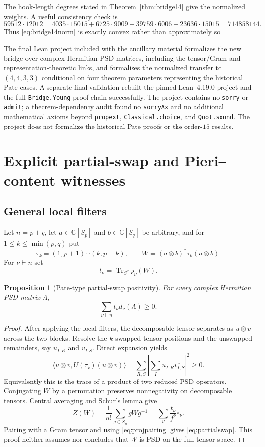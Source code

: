 \documentclass[11pt]{article}
\newtheorem{proposition}[theorem]{Proposition}
\theoremstyle{definition}
\newcommand{\Tr}{\operatorname{Tr}}
\newcommand{\C}{\mathbb C}
\begin{document}
The hook-length degrees stated in Theorem~\ref{thm:bridge14} give the normalized weights.  A useful consistency check is
\[
 59512\cdot12012=4035\cdot15015+6725\cdot9009+39759\cdot6006+23636\cdot15015=714858144.
\]
Thus \eqref{eq:bridge14norm} is exactly convex rather than approximately so.

The final Lean project included with the ancillary material formalizes the new bridge over complex Hermitian PSD matrices, including the tensor/Gram and representation-theoretic links, and formalizes the normalized transfer to $(4,4,3,3)$ conditional on four theorem parameters representing the historical Pate cases.  A separate final validation rebuilt the pinned Lean~4.19.0 project and the full \texttt{Bridge.Young} proof chain successfully.  The project contains no \texttt{sorry} or \texttt{admit}; a theorem-dependency audit found no \texttt{sorryAx} and no additional mathematical axioms beyond \texttt{propext}, \texttt{Classical.choice}, and \texttt{Quot.sound}.  The project does not formalize the historical Pate proofs or the order-$15$ results.

\section{Explicit partial-swap and Pieri--content witnesses}\label{sec:pieri}
\subsection{General local filters}
Let $n=p+q$, let $a\in\C[S_p]$ and $b\in\C[S_q]$ be arbitrary, and for $1\le k\le\min(p,q)$ put
\[
 \tau_k=(1,p+1)\cdots(k,p+k),\qquad
 W=(a\otimes b)^*\tau_k(a\otimes b).
\]
For $\nu\vdash n$ set
\[
 t_\nu=\Tr_{S^\nu}\rho_\nu(W).
\]

\begin{proposition}[Pate-type partial-swap positivity]\label{prop:partialswap}
For every complex Hermitian PSD matrix $A$,
\begin{equation}\label{eq:partialswap}
 \sum_{\nu\vdash n}t_\nu d_\nu(A)\ge0.
\end{equation}
\end{proposition}

\begin{proof}
After applying the local filters, the decomposable tensor separates as $u\otimes v$ across the two blocks.  Resolve the $k$ swapped tensor positions and the unswapped remainders, say $u_{I,R}$ and $v_{I,S}$.  Direct expansion yields
\[
 \langle u\otimes v,U(\tau_k)(u\otimes v)\rangle
 =\sum_{R,S}\left|\sum_Iu_{I,R}\overline{v_{I,S}}\right|^2\ge0.
\]
Equivalently this is the trace of a product of two reduced PSD operators.  Conjugating $W$ by a permutation preserves nonnegativity on decomposable tensors.  Central averaging and Schur's lemma give
\[
 Z(W)=\frac1{n!}\sum_{g\in S_n}gWg^{-1}
 =\sum_\nu\frac{t_\nu}{f^\nu}e_\nu.
\]
Pairing with a Gram tensor and using \eqref{eq:projpairing} gives \eqref{eq:partialswap}.  This proof neither assumes nor concludes that $W$ is PSD on the full tensor space.
\end{proof}
\end{document}
